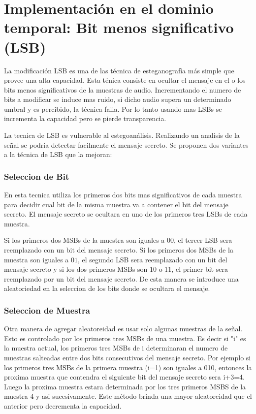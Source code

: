 \documentclass[conference,a4paper,10pt, oneside,final]{tfmpd}
\begin{document}
\section{Implementación en el dominio temporal: Bit menos significativo (LSB)}
La modificación LSB es una de las técnica de esteganografía más simple que provee una alta capacidad. Esta ténica consiste en ocultar el mensaje en el o los bits menos significativos de la muestras de audio.
Incrementando el numero de bits a modificar se induce mas ruido, si dicho audio supera un determinado umbral y es percibido, la técnica falla. Por lo tanto usando mas LSBs se incrementa la capacidad pero se pierde transparencia.

La tecnica de LSB es vulnerable al estegoanálisis. Realizando un analisis de la señal se podria detectar facilmente el mensaje secreto.
Se proponen dos variantes a la técnica de LSB que la mejoran:

\subsubsection{Seleccion de Bit}

En esta tecnica utiliza los primeros dos bits mas significativos de cada muestra para decidir cual bit de la misma muestra va a contener el bit del mensaje secreto. El mensaje secreto se ocultara en uno de los primeros tres LSBs de cada muestra.

Si los primeros dos MSBs de la muestra son iguales a $00$, el tercer LSB sera reemplazado con un bit del mensaje secreto. Si los primeros dos MSBs de la muestra son iguales a $01$, el segundo LSB sera reemplazado con un bit del mensaje secreto y si los dos primeros MSBs son $10$ o $11$, el primer bit sera reemplazado por un bit del mensaje secreto.
De esta manera se introduce una aleatoriedad en la seleccion de los bits donde se ocultara el mensaje.

\subsubsection{Seleccion de Muestra}
Otra manera de agregar aleatoreidad es usar solo algunas muestras de la señal. Esto es controlado por los primeros tres MSBs de una muestra. Es decir si "i" es la muestra actual, los primeros tres MSBs de i determinaran el numero de muestras salteadas entre dos bits consecutivos del mensaje secreto. Por ejemplo si los primeros tres MSBs de la primera muestra (i=1) son iguales a 010, entonces la proxima muestra que contendra el siguiente bit del mensaje secreto sera i+3=4. Luego la proxima muestra estara determinada por los tres primeros MSBS de la muestra 4 y asi sucesivamente. Este método brinda una mayor aleatoreidad que el anterior pero decrementa la capacidad.
\end{document}
